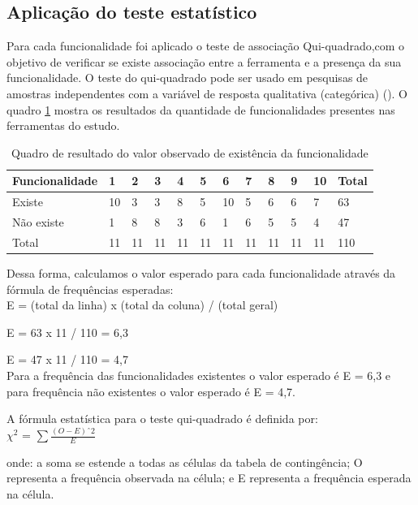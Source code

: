 \subsection{Aplicação do teste estatístico}

Para cada funcionalidade foi aplicado o teste de associação Qui-quadrado,com o objetivo de verificar se existe associação entre a ferramenta e a presença da sua funcionalidade. O teste do qui-quadrado pode ser usado em pesquisas de amostras independentes com a variável de resposta qualitativa (categórica) (\cite{barbetta:2012}). O quadro \ref{distribuicao} mostra os resultados da quantidade de funcionalidades presentes nas ferramentas do estudo.

\begin{table}
	\centering
	\caption{Quadro de resultado do valor observado de existência da funcionalidade}
	\label{distribuicao}
	\begin{tabular}{|l|l|l|l|l|l|l|l|l|l|l|l|}
		\hline
		Funcionalidade & 1 & 2 & 3 & 4 & 5 & 6 & 7 & 8 & 9 & 10 & Total \\ \hline
		Existe & 10 & 3 & 3 & 8 & 5 & 10 & 5 & 6 & 6 & 7 & 63 \\ \hline
		Não existe & 1 & 8 & 8 & 3 & 6 & 1 & 6 & 5 & 5 & 4 & 47 \\ \hline
		Total & 11 & 11 & 11 & 11 & 11 & 11 & 11 & 11 & 11 & 11 & 110 \\ \hline
	\end{tabular}
\end{table}

Dessa forma, calculamos o valor esperado para cada funcionalidade através da fórmula de frequências esperadas:
\\

E = (total da linha) x (total da coluna) / (total geral)

E = 63 x 11 / 110 = 6,3

E = 47 x 11 / 110 = 4,7
\\

Para a frequência das funcionalidades existentes o valor esperado é E = 6,3 e para frequência não existentes o valor esperado é E = 4,7.


A fórmula estatística para o teste qui-quadrado é definida por:
\\


 $ \chi^2 $ = $\sum \frac{(O-E)ˆ2}{E}$


 onde:
 a soma se estende a todas as células da tabela de contingência; 
 O representa a frequência observada na célula; e
 E representa a frequência esperada na célula.

